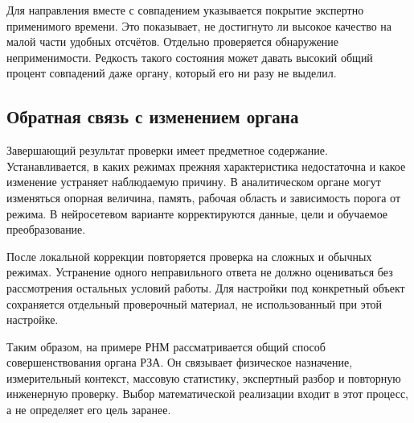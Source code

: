 Для направления вместе с совпадением
указывается покрытие экспертно применимого времени.
Это показывает, не достигнуто ли высокое качество
на малой части удобных отсчётов.
Отдельно проверяется обнаружение неприменимости.
Редкость такого состояния может давать
высокий общий процент совпадений даже органу,
который его ни разу не выделил.

{}

\subsection{Обратная связь с изменением органа}

Завершающий результат проверки имеет
предметное содержание. Устанавливается,
в каких режимах прежняя характеристика
недостаточна и какое изменение устраняет
наблюдаемую причину.
В аналитическом органе могут изменяться
опорная величина, память, рабочая область
и зависимость порога от режима.
В нейросетевом варианте корректируются
данные, цели и обучаемое преобразование.

После локальной коррекции повторяется
проверка на сложных и обычных режимах.
Устранение одного неправильного ответа
не должно оцениваться без рассмотрения
остальных условий работы.
Для настройки под конкретный объект
сохраняется отдельный проверочный материал,
не использованный при этой настройке.

Таким образом, на примере РНМ рассматривается
общий способ совершенствования органа РЗА.
Он связывает физическое назначение,
измерительный контекст, массовую статистику,
экспертный разбор и повторную инженерную проверку.
Выбор математической реализации входит
в этот процесс, а не определяет его цель заранее.

